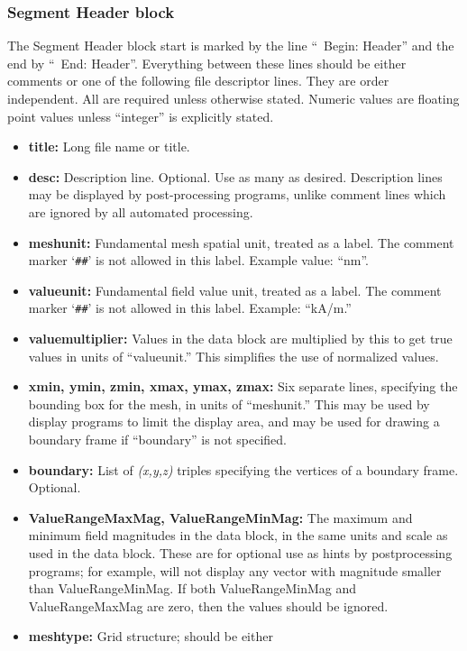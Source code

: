\subsubsection{Segment Header block}\label{sec:ovfsegmentheader}
The Segment Header block start is marked by the line
``\lb~Begin: Header'' and the end by ``\lb~End: Header''.  Everything
between these lines should be either comments or one of the following
file descriptor lines.  They are order independent.  All are required
unless otherwise stated.  Numeric values are floating point values
unless ``integer'' is explicitly stated.
\begin{itemize}
\item {\bf title:} Long file name or title.
\item {\bf desc:} Description line.  Optional.  Use as many as desired.
   Description lines may be displayed by post-processing programs,
   unlike comment lines which are ignored by all automated processing.
\item {\bf meshunit:} Fundamental mesh spatial unit, treated as a
   label.  The comment marker `\verb+##+' is not allowed in this label.
   Example value: ``nm''.
\item {\bf valueunit:} Fundamental field value unit, treated as a
   label.  The comment marker `\verb+##+' is not allowed in this label.
   Example: ``kA/m.''
\item {\bf valuemultiplier:} Values in the data block are multiplied by
   this to get true values in units of ``valueunit.''  This simplifies
   the use of normalized values.
\item {\bf xmin, ymin, zmin, xmax, ymax, zmax:} Six separate lines,
   specifying the bounding box for the mesh, in units of ``meshunit.''
   This may be used by display programs to limit the display area,
   and may be used for drawing a boundary frame if ``boundary'' is not
   specified.
\item {\bf boundary:} List of {\it (x,y,z)} triples specifying the
   vertices of a boundary frame.  Optional.
\item {\bf ValueRangeMaxMag, ValueRangeMinMag:}  The maximum and
   minimum field magnitudes in the data block, in the same
   units and scale as used in the data block.  These are for optional
   use as hints by postprocessing programs; for example, 
   will not display any vector with magnitude smaller than
   ValueRangeMinMag.  If both ValueRangeMinMag and ValueRangeMaxMag
   are zero, then the values should be ignored.
\item {\bf meshtype:} Grid structure; should be either

\end{itemize}
